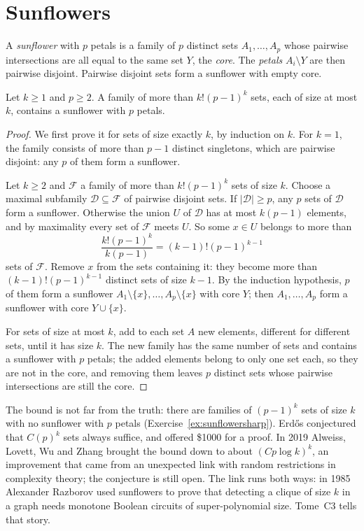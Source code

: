 \section{Sunflowers}

A \emph{sunflower} with $p$ petals is a family of $p$ distinct sets $A_1,\dots,A_p$ whose pairwise intersections are all equal to the same set $Y$, the \emph{core}. The
\emph{petals} $A_i\setminus Y$ are then pairwise disjoint. Pairwise disjoint sets form a sunflower with empty core.

\begin{theorem}\label{thm:sunflower}
Let $k\ge1$ and $p\ge2$. A family of more than $k!(p-1)^k$ sets, each of size at most $k$, contains a sunflower with $p$ petals.
\end{theorem}
\begin{proof}
We first prove it for sets of size exactly $k$, by induction on $k$. For $k=1$, the family consists of more than $p-1$ distinct singletons, which are pairwise disjoint: any $p$ of them form a sunflower.

Let $k\ge2$ and $\mathcal F$ a family of more than $k!(p-1)^k$ sets of size $k$. Choose a maximal subfamily $\mathcal D\subseteq\mathcal F$ of pairwise disjoint sets. If $|\mathcal D|\ge p$,
any $p$ sets of $\mathcal D$ form a sunflower. Otherwise the union $U$ of $\mathcal D$ has at most $k(p-1)$ elements, and by maximality every set of $\mathcal F$ meets $U$. So some $x\in U$ belongs to
more than
\[
\frac{k!(p-1)^k}{k(p-1)}=(k-1)!(p-1)^{k-1}
\]
sets of $\mathcal F$. Remove $x$ from the sets containing it: they become more than $(k-1)!(p-1)^{k-1}$ distinct sets of size $k-1$. By the induction hypothesis, $p$ of them form a sunflower
$A_1\setminus\{x\},\dots,A_p\setminus\{x\}$ with core $Y$; then $A_1,\dots,A_p$ form a sunflower with core $Y\cup\{x\}$.

For sets of size at most $k$, add to each set $A$ new elements, different for different sets, until it has size $k$. The new family has the same number of sets and
contains a sunflower with $p$ petals; the added elements belong to only one set each, so they are not in the core, and removing them leaves $p$ distinct sets whose pairwise
intersections are still the core.
\end{proof}

The bound is not far from the truth: there are families of $(p-1)^k$ sets of size $k$ with no sunflower with $p$ petals (Exercise~\ref{ex:sunflowersharp}). Erd\H os
conjectured that $C(p)^k$ sets always suffice, and offered \$1000 for a proof. In 2019 Alweiss, Lovett, Wu and Zhang brought the bound down to about $(Cp\log k)^k$, an
improvement that came from an unexpected link with random restrictions in complexity theory; the conjecture is still open. The link runs both ways: in 1985 Alexander
Razborov used sunflowers to prove that detecting a clique of size $k$ in a graph needs monotone Boolean circuits of super-polynomial size. Tome~C3 tells that story.

